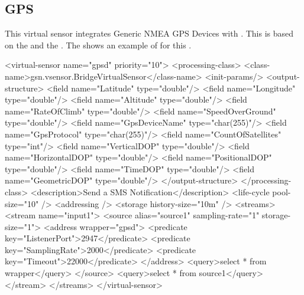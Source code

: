 \subsection{GPS \vs \label{quickref_gps_vs}}

This virtual sensor integrates Generic NMEA GPS Devices with \gsn.
This \vs is based on the  \vsp and the  \wrapper.
The  shows an example of \vsd for this \vs.

\begin{xmlcode}[caption={Sample of VSD using the Gpsd Wrapper}, label=listing:xml:gpsd_vsd]
<virtual-sensor name="gpsd" priority="10">
	<processing-class>
		<class-name>gsn.vsensor.BridgeVirtualSensor</class-name>
		<init-params/>
		<output-structure>
			<field name="Latitude" type="double"/>
			<field name="Longitude" type="double"/>
			<field name="Altitude" type="double"/>
			<field name="RateOfClimb" type="double"/>
			<field name="SpeedOverGround" type="double"/>
			<field name="GpsDeviceName" type="char(255)"/>
			<field name="GpsProtocol" type="char(255)"/>
			<field name="CountOfSatellites" type="int"/>
			<field name="VerticalDOP" type="double"/>
			<field name="HorizontalDOP" type="double"/>
			<field name="PositionalDOP" type="double"/>
			<field name="TimeDOP" type="double"/>
			<field name="GeometricDOP" type="double"/>
		</output-structure>
	</processing-class>
	<description>Send a SMS Notification</description>
	<life-cycle pool-size="10" />
	<addressing />
	<storage history-size="10m" />
	<streams>
		<stream name="input1">
			<source alias="source1" sampling-rate="1" storage-size="1">
				<address wrapper="gpsd">
					<predicate key="ListenerPort">2947</predicate>
					<predicate key="SamplingRate">2000</predicate>
					<predicate key="Timeout">22000</predicate>
				</address>
				<query>select * from wrapper</query>
			</source>
			<query>select * from source1</query>
		</stream> 
	</streams>
</virtual-sensor>
\end{xmlcode}